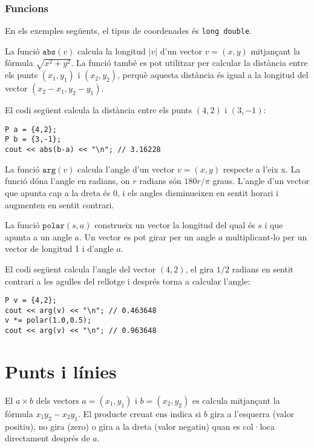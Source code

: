 \subsubsection*{Funcions}

En els exemples següents, el tipus de coordenades és \texttt{long double}.

La funció $\texttt{abs}(v)$ calcula la longitud $|v|$ d'un vector
$v=(x,y)$ mitjançant la fórmula $\sqrt{x^2+y^2}$. La funció també es
pot utilitzar per calcular la distància entre els punts $(x_1,y_1)$ i
$(x_2,y_2)$, perquè aquesta distància és igual a la longitud del
vector $(x_2-x_1,y_2-y_1)$.

El codi següent calcula la distància entre els punts $(4,2)$ i $(3,-1)$:
\begin{lstlisting}
P a = {4,2};
P b = {3,-1};
cout << abs(b-a) << "\n"; // 3.16228
\end{lstlisting}


La funció $\texttt{arg}(v)$ calcula l'angle d'un vector $v=(x,y)$
respecte a l'eix x. La funció dóna l'angle en radians, on $r$ radians
són $180 r/\pi$ graus. L'angle d'un vector que apunta cap a la
dreta és 0, i els angles disminueixen en sentit horari i augmenten en
sentit contrari.

La funció $\texttt{polar}(s,a)$ construeix un vector la longitud del
qual és $s$ i que apunta a un angle $a$. Un vector es pot girar per un
angle $a$ multiplicant-lo per un vector de longitud 1 i d'angle $a$.

El codi següent calcula l'angle del vector $(4,2)$, el gira $1/2$
radians en sentit contrari a les agulles del rellotge i després torna
a calcular l'angle:


\begin{lstlisting}
P v = {4,2};
cout << arg(v) << "\n"; // 0.463648
v *= polar(1.0,0.5);
cout << arg(v) << "\n"; // 0.963648
\end{lstlisting}


\section{Punts i línies}


El  $a \times b$ dels vectors $a=(x_1,y_1)$ i
$b=(x_2,y_2)$ es calcula mitjançant la fórmula $x_1 y_2 - x_2 y_1$. El
producte creuat ens indica si $b$ gira a l'esquerra (valor positiu),
no gira (zero) o gira a la dreta (valor negatiu) quan es col·loca
directament després de $a$.

